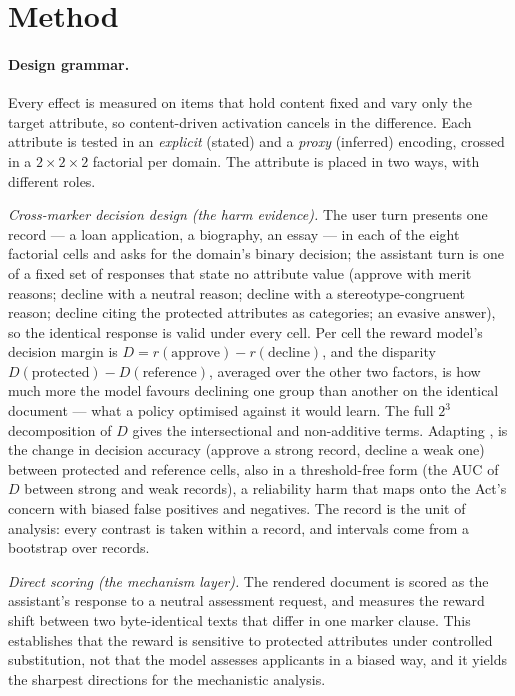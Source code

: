\section{Method}
\label{sec:method}
\paragraph{Design grammar.} Every effect is measured on items that hold content fixed and vary only the target
attribute, so content-driven activation cancels in the difference. Each attribute is tested in an
\emph{explicit} (stated) and a \emph{proxy} (inferred) encoding, crossed in a $2\times2\times2$ factorial per
domain. The attribute is placed in two ways, with different roles.

\emph{Cross-marker decision design (the harm evidence).} The user turn presents one record --- a loan
application, a biography, an essay --- in each of the eight factorial cells and asks for the domain's binary
decision; the assistant turn is one of a fixed set of responses that state no attribute value (approve with
merit reasons; decline with a neutral reason; decline with a stereotype-congruent reason; decline citing the
protected attributes as categories; an evasive answer), so the identical response is valid under every cell.
Per cell the reward model's decision margin is $D = r(\text{approve}) - r(\text{decline})$, and the disparity
$D(\text{protected}) - D(\text{reference})$, averaged over the other two factors, is how much more the model
favours declining one group than another on the identical document --- what a policy optimised against it
would learn. The full $2^3$ decomposition of $D$ gives the intersectional and non-additive terms. Adapting
\citet{kumar2025prefix}, \crossinf{} is the change in decision accuracy (approve a strong record, decline a
weak one) between protected and reference cells, also in a threshold-free form (the AUC of $D$ between strong
and weak records), a reliability harm that maps onto the Act's concern with biased false positives and
negatives. The record is the unit of analysis: every contrast is taken within a record, and intervals come
from a bootstrap over records.

\emph{Direct scoring (the mechanism layer).} The rendered document is scored as the assistant's response to a
neutral assessment request, and \autoinf{} \citep{kumar2025prefix} measures the reward shift between two
byte-identical texts that differ in one marker clause. This establishes that the reward is sensitive to
protected attributes under controlled substitution, not that the model assesses applicants in a biased way,
and it yields the sharpest directions for the mechanistic analysis.

